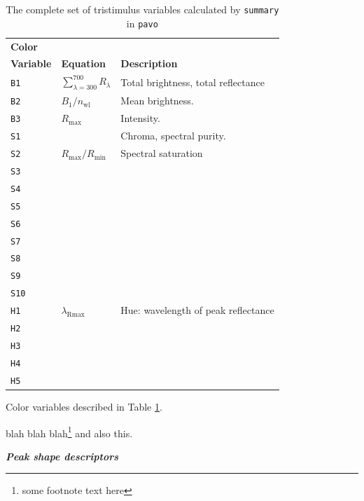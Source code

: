 \documentclass{article}
\newcommand{\pavo}{{\tt pavo}}  %
\newcommand{\code}[1]{{\tt #1}}  %
\begin{document}
\begin{table}[h]
\begin{center}
\begin{tabular}{l l l} \hline
{\bf Color} & \\
{\bf Variable} & {\bf Equation} & {\bf Description} \\ 
\hline
\code{B1} & {$\sum_{\lambda={300}}^{700} R_\lambda$} & \parbox[t]{3in}{Total brightness, total reflectance}  \\
\code{B2} & {$B_\text{1}/n_\text{wl}$} & \parbox[t]{3in}{Mean brightness.} \\
\code{B3} & {$R_\text{max}$} & \parbox[t]{3in}{Intensity.} \\
\code{S1} & {} & \parbox[t]{3in}{Chroma, spectral purity.} \\
\code{S2} & {$R_\text{max}/R_\text{min}$} & \parbox[t]{3in}{Spectral saturation} \\
\code{S3} & {} & \parbox[t]{3in}{} \\
\code{S4} & {} & \parbox[t]{3in}{} \\
\code{S5} & {} & \parbox[t]{3in}{} \\
\code{S6} & {} & \parbox[t]{3in}{} \\
\code{S7} & {} & \parbox[t]{3in}{} \\
\code{S8} & {} & \parbox[t]{3in}{} \\
\code{S9} & {} & \parbox[t]{3in}{} \\
\code{S10} & {} & \parbox[t]{3in}{} \\
\code{H1} & {$\lambda_\text{Rmax}$} & \parbox[t]{3in}{Hue: wavelength of peak reflectance} \\
\code{H2} & {} & \parbox[t]{3in}{} \\
\code{H3} & {} & \parbox[t]{3in}{} \\
\code{H4} & {} & \parbox[t]{3in}{} \\
\code{H5} & {} & \parbox[t]{3in}{} \\
\hline
\end{tabular}
\end{center}
\caption{\label{table:tristim}
The complete set of tristimulus variables calculated by \code{summary} in \pavo{}}
\end{table}

Color variables described in Table \ref{table:tristim}.

blah blah blah\footnote{some footnote text here} and also this.

\textit{\textbf{Peak shape descriptors}}
\end{document}
